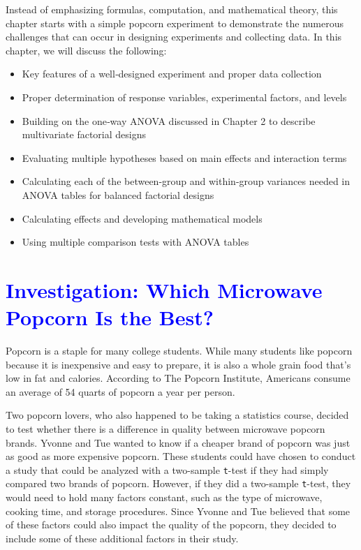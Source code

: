 \documentclass[
]{report}
\begin{document}
Instead of emphasizing formulas, computation, and mathematical theory, this chapter starts with a simple popcorn experiment to demonstrate the numerous challenges that can occur in designing experiments and collecting data. In this chapter, we will discuss the following:
\vspace{-1em}

\begin{itemize}
\item  Key features of a well‑designed experiment and proper data collection
\item  Proper determination of response variables, experimental factors, and levels  
\item  Building on the one‑way ANOVA discussed in Chapter 2 to describe multivariate factorial designs  
\item  Evaluating multiple hypotheses based on main effects and interaction terms  
\item  Calculating each of the between-group and within-group variances needed in ANOVA tables for balanced factorial designs  
\item  Calculating effects and developing mathematical models  
\item  Using multiple comparison tests with ANOVA tables  
\end{itemize}

\newpage

\hypertarget{section-39}{%
\section{\texorpdfstring{\textcolor{blue}{Investigation: Which Microwave Popcorn Is the Best?}}{}}\label{section-39}}

Popcorn is a staple for many college students. While many students like popcorn because it is inexpensive and easy to prepare, it is also a whole grain food that's low in fat and calories. According to The Popcorn Institute, Americans consume an average of 54 quarts of popcorn a year per person.

Two popcorn lovers, who also happened to be taking a statistics course, decided to test whether there is a difference in quality between microwave popcorn brands. Yvonne and Tue wanted to know if a cheaper brand of popcorn was just as good as more expensive popcorn. These students could have chosen to conduct a study that could be analyzed with a two-sample \texttt{t}-test if they had simply compared two brands of popcorn. However, if they did a two-sample \texttt{t}-test, they would need to hold many factors constant, such as the type of microwave, cooking time, and storage procedures. Since Yvonne and Tue believed that some of these factors could also impact the quality of the popcorn, they decided to include some of these additional factors in their study.
\end{document}
